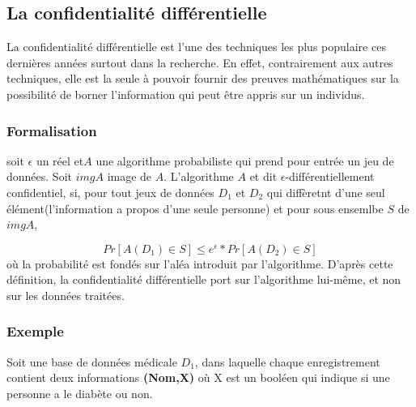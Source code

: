 \subsection{La confidentialité différentielle}
La confidentialité différentielle est l'une des techniques les plus populaire ces dernières années surtout dans la recherche. En effet, contrairement aux autres techniques, elle est la seule à pouvoir fournir des preuves mathématiques sur la possibilité de borner l'information qui peut être appris sur un individus.

\subsubsection{Formalisation}
soit \begin{math}\epsilon\end{math} un réel et\begin{math}A\end{math} une algorithme probabiliste qui prend pour entrée un jeu de données. Soit \begin{math}imgA\end{math} image de \begin{math}A\end{math}. L'algorithme \begin{math}A\end{math} et dit \begin{math}\epsilon\end{math}-différentiellement confidentiel, si, pour tout jeux de données \begin{math}D_{1}\end{math} et \begin{math}D_{2}\end{math} qui diffèretnt d'une seul élément(l'information a propos d'une seule personne) et pour sous ensemlbe \begin{math}S\end{math} de \begin{math}imgA\end{math},

\[
Pr[A(D_{1})\in S] \leq e^{\epsilon} * Pr[A(D_{2})\in S]
\]
où la probabilité est fondés sur l'aléa introduit par l'algorithme. D'après cette définition, la confidentialité différentielle port sur l'algorithme lui-même, et non sur les données traitées.
\subsubsection{Exemple}
Soit une base de données médicale \begin{math}D_{1}\end{math}, dans laquelle chaque enregistrement contient deux informations \textbf{(Nom,X)} où X est un booléen qui indique si une personne a le diabète ou non.


